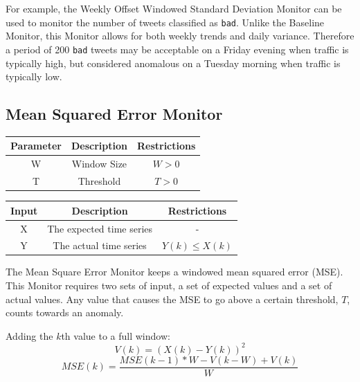 \documentclass[12pt]{ucthesis}
\begin{document}
For example, the Weekly Offset Windowed Standard Deviation Monitor can be used to monitor the number of tweets classified as \texttt{bad}.
Unlike the Baseline Monitor, this Monitor allows for both weekly trends and daily variance.
Therefore a period of 200 \texttt{bad} tweets may be acceptable on a Friday evening when traffic is typically high, but considered anomalous on a Tuesday morning when traffic is typically low.

\subsection{Mean Squared Error Monitor}
\label{outage-detection-monitors-MSE}
\begin{table}[H]
   \begin{center}
      \begin{tabular}{|c|c|c|}
         \hline
            Parameter & Description & Restrictions \\
         \hline
            W & Window Size & $ W > 0 $\\
         \hline
            T & Threshold & $ T > 0 $\\
         \hline
      \end{tabular}
   \end{center}
\end{table}

\begin{table}[H]
   \begin{center}
      \begin{tabular}{|c|c|c|}
         \hline
            Input & Description & Restrictions \\
         \hline
            X & The expected time series & - \\
         \hline
            Y & The actual time series & $ Y(k) \leq X(k) $ \\
         \hline
      \end{tabular}
   \end{center}
\end{table}

The Mean Square Error Monitor keeps a windowed mean squared error (MSE). This Monitor requires two sets of input, a set
of expected values and a set of actual values. Any value that causes the MSE to go above a certain threshold, $T$,
counts towards an anomaly.

Adding the $k$th value to a full window:
$$
   V(k) = (X(k) - Y(k))^{2}
$$
$$
   MSE(k) = \frac{MSE(k - 1) * W - V(k - W) + V(k)}{W}
$$
\end{document}
